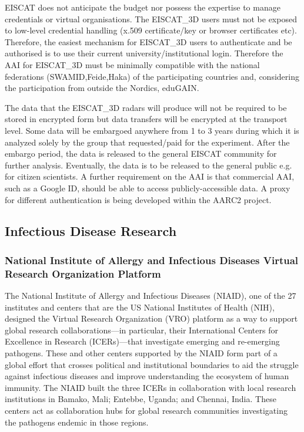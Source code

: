 \documentclass[fleqn,11pt]{wlscirep}
\begin{document}
{EISCAT does not anticipate the budget nor possess the expertise to manage credentials or virtual organisations. The EISCAT\_3D users must not be exposed to low-level credential handling (x.509 certificate/key or browser certificates etc). Therefore, the easiest mechanism for EISCAT\_3D users to authenticate and be authorised is to use their current  university/institutional login. Therefore the AAI for EISCAT\_3D must be minimally compatible with the national federations (SWAMID,Feide,Haka) of the participating countries and, considering the participation from outside the Nordics, eduGAIN.

The data that the EISCAT\_3D radars will produce will not be required to be stored in encrypted form but data transfers will be encrypted at the transport level. Some data will be embargoed anywhere from 1 to 3 years during which it is analyzed solely by the group that requested/paid for the experiment. After the embargo period, the data is released to the general EISCAT community for further analysis. Eventually, the data is to be released to the general public e.g. for citizen scientists. A further requirement on the AAI is that commercial AAI, such as a Google ID, should be able to access publicly-accessible data. A proxy for different authentication is being developed within the AARC2 project. 

\subsection{Infectious Disease Research}
\subsubsection{National Institute of Allergy and Infectious Diseases Virtual Research Organization Platform}
The National Institute of Allergy and Infectious Diseases (NIAID), one of the 27 institutes and centers that are the US National Institutes of Health (NIH), designed the Virtual Research Organization (VRO) platform as a way to support global research collaborations—in particular, their International Centers for Excellence in Research (ICERs)—that investigate emerging and re-emerging pathogens.  These and other centers supported by the NIAID form part of a global effort that crosses political and institutional boundaries to aid the struggle against infectious diseases and improve understanding the ecosystem of human immunity.  The NIAID built the three ICERs in collaboration with local research institutions in Bamako, Mali; Entebbe, Uganda; and Chennai, India.  These centers act as collaboration hubs for global research communities investigating the pathogens endemic in those regions.

}
\end{document}
